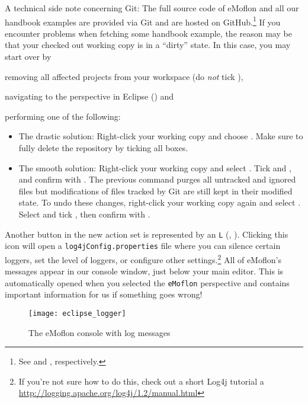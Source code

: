 \begin{stepbystep}
A technical side note concerning Git:
The full source code of eMoflon and all our handbook examples are provided via Git and are hosted on GitHub.\footnote{See  and , respectively.}
If you encounter problems when fetching some handbook example, the reason may be that your checked out working copy is in a \enquote{dirty} state.
In this case, you may start over by 
\begin{inparaenum}[(i)]
\item removing all affected projects from your workspace (do \emph{not} tick ),
\item navigating to the  perspective in Eclipse () and
\item performing one of the following:
\end{inparaenum}
\begin{itemize}
\item The drastic solution:
Right-click your working copy \eMoflonExamplesRepo and choose .
Make sure to fully delete the repository by ticking all boxes.
\item The smooth solution:
Right-click your working copy \eMoflonExamplesRepo and select .
Tick  and , and confirm with .
The previous command purges all untracked and ignored files but modifications of files tracked by Git are still kept in their modified state.
To undo these changes, right-click your working copy again and select .
Select  and tick , then confirm with .
\end{itemize}


\item
Another button in the new action set is  represented by an \texttt{L} (\eMoflonConfigureLoggingIcon, ).
Clicking this icon will open a \texttt{log4jConfig\-.properties} file where you can silence certain loggers, set the level of loggers, or configure other
settings.\footnote{If you're not sure how to do this, check out a short Log4j tutorial a \url{http://logging.apache.org/log4j/1.2/manual.html}} All of eMoflon's
messages appear in our console window, just below your main editor. This is automatically opened when you selected the \texttt{eMoflon} perspective and
contains important information for us if something goes wrong!

\begin{figure}[htbp]
	\centering
  \texttt{[image: eclipse\_logger]}
	\caption{The eMoflon console with log messages}
	\label{eclipse:logger}
\end{figure} 
\end{stepbystep}



